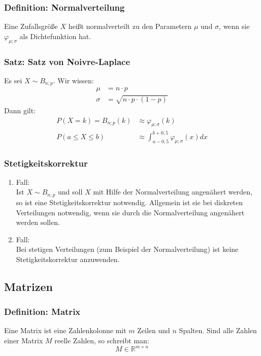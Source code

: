 \documentclass{article}
\begin{document}
  	\subsubsection{Definition: Normalverteilung}
  	Eine Zufallsgröße $X$ heißt normalverteilt zu den Parametern $\mu$ und $\sigma$, wenn sie $\varphi_{\mu;\sigma}$ als Dichtefunktion hat. 
  	
  	\subsubsection{Satz: Satz von Noivre-Laplace}
  Es sei $X \sim B_{n;p}$. Wir wissen: 
  \begin{align*}
  	\mu &= n \cdot p \\
  	\sigma &= \sqrt{n \cdot p \cdot (1 - p)}
  \end{align*}
  Dann gilt:
  \begin{align*}
  	P(X=k) = B_{n;p}(k) &\approx \varphi_{\mu;\sigma}(k) \\
  	P(a \leqslant X \leqslant b) &\approx \int^{b+0,5}_{a-0,5} \varphi_{\mu;\sigma}(x) dx
  \end{align*}
  
  \subsubsection{Stetigkeitskorrektur}
  
  \begin{enumerate}
  	\item Fall: \\
  	Ist $X \sim B_{n;p}$ und soll $X$ mit Hilfe der Normalverteilung angenähert werden, so ist eine Stetigkeitskorrektur notwendig. Allgemein ist sie bei diskreten Verteilungen notwendig, wenn sie durch die Normalverteilung angenähert werden sollen.
  	\item Fall: \\
  	Bei stetigen Verteilungen (zum Beispiel der Normalverteilung) ist keine Stetigkeitskorrektur anzuwenden. 
  \end{enumerate}
  
  \subsection{Matrizen}
  	
  	\subsubsection{Definition: Matrix}
  	Eine Matrix ist eine Zahlenkolonne mit $m$ Zeilen und $n$ Spalten. Sind alle Zahlen einer Matrix $M$ reelle Zahlen, so schreibt man: 
  	\begin{equation*}
  		M \in \mathbb{R}^{m \times n}
  	\end{equation*}
  	
\end{document}

